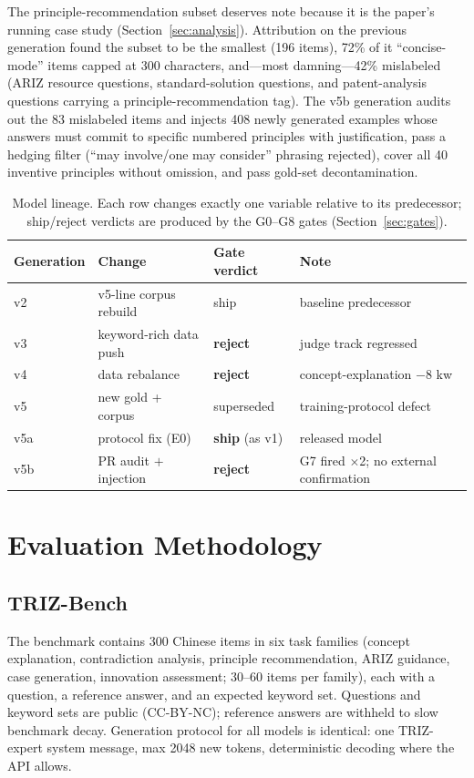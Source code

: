 \documentclass[11pt]{article}
\begin{document}
The principle-recommendation subset deserves note because it is the
paper's running case study (Section~\ref{sec:analysis}). Attribution on
the previous generation found the subset to be the smallest (196 items),
72\% of it ``concise-mode'' items capped at 300 characters, and---most
damning---42\% mislabeled (ARIZ resource questions, standard-solution
questions, and patent-analysis questions carrying a
principle-recommendation tag). The v5b generation audits out the 83
mislabeled items and injects 408 newly generated examples whose answers
must commit to specific numbered principles with justification, pass a
hedging filter (``may involve/one may consider'' phrasing rejected),
cover all 40 inventive principles without omission, and pass gold-set
decontamination.

\begin{table}[t]
\centering
\small
\caption{Model lineage. Each row changes exactly one variable relative
to its predecessor; ship/reject verdicts are produced by the G0--G8
gates (Section~\ref{sec:gates}).}
\label{tab:lineage}
\begin{tabular}{@{}llll@{}}
\toprule
Generation & Change & Gate verdict & Note \\
\midrule
v2 & v5-line corpus rebuild & ship & baseline predecessor \\
v3 & keyword-rich data push & \textbf{reject} & judge track regressed \\
v4 & data rebalance & \textbf{reject} & concept-explanation $-8$ kw \\
v5 & new gold + corpus & superseded & training-protocol defect \\
v5a & protocol fix (E0) & \textbf{ship} (as v1) & released model \\
v5b & PR audit $+$ injection & \textbf{reject} & G7 fired $\times$2; no external confirmation \\
\bottomrule
\end{tabular}
\end{table}

\section{Evaluation Methodology}
\label{sec:eval}

\subsection{TRIZ-Bench}
The benchmark contains 300 Chinese items in six task families
(concept explanation, contradiction analysis, principle recommendation,
ARIZ guidance, case generation, innovation assessment; 30--60 items per
family), each with a question, a reference answer, and an expected
keyword set. Questions and keyword sets are public (CC-BY-NC); reference
answers are withheld to slow benchmark decay. Generation protocol for
all models is identical: one TRIZ-expert system message, max 2048 new
tokens, deterministic decoding where the API allows.
\end{document}
